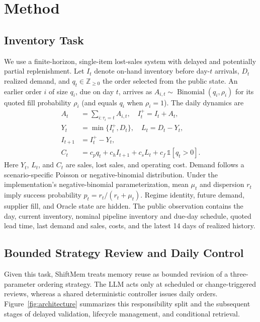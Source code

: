 \section{Method}
\label{sec:method}

\subsection{Inventory Task}
\label{sec:inventory-task}

We use a finite-horizon, single-item lost-sales system with delayed and
potentially partial replenishment. Let $I_t$ denote on-hand inventory before
day-$t$ arrivals, $D_t$ realized demand, and $q_t\in\mathbb{Z}_{\geq 0}$ the
order selected from the public state. An earlier order $i$ of size $q_i$, due
on day $t$, arrives as $A_{i,t}\sim\operatorname{Binomial}(q_i,\rho_i)$ for its
quoted fill probability $\rho_i$ (and equals $q_i$ when $\rho_i=1$). The daily
dynamics are
\begin{align}
 A_t &= \textstyle\sum_{i:\tau_i=t} A_{i,t}, \quad
       I_t^{+} = I_t + A_t, \nonumber\\
 Y_t &= \min\{I_t^{+},D_t\}, \quad
       L_t = D_t-Y_t, \label{eq:inventory}\\
 I_{t+1} &= I_t^{+}-Y_t, \nonumber\\
 C_t &= c_p q_t+c_h I_{t+1}+c_s L_t+c_f\,\mathbb{1}[q_t>0]. \nonumber
\end{align}
Here $Y_t$, $L_t$, and $C_t$ are sales, lost sales, and operating cost. Demand
follows a scenario-specific Poisson or negative-binomial distribution. Under the
implementation's negative-binomial parameterization, mean $\mu_t$ and
dispersion $r_t$ imply success probability
$p_t=r_t/(r_t+\mu_t)$. Regime identity, future demand, supplier fill, and Oracle
state are hidden. The public observation contains the day, current inventory,
nominal pipeline inventory and due-day schedule, quoted lead time, last demand
and sales, costs, and the latest 14 days of realized history.

\subsection{Bounded Strategy Review and Daily Control}
\label{sec:bounded-control}

Given this task, ShiftMem treats memory reuse as bounded revision of a
three-parameter ordering strategy. The LLM acts only at scheduled or
change-triggered reviews, whereas a shared deterministic controller issues
daily orders. Figure~\ref{fig:architecture} summarizes this responsibility
split and the subsequent stages of delayed validation, lifecycle management,
and conditional retrieval.

